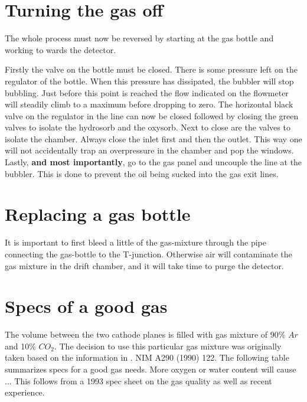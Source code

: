\documentclass[11pt]{report}
\begin{document}
\section{Turning the gas off}

The whole process must now be reversed by starting at the gas bottle 
and working to wards the detector.

Firstly the valve on the bottle must be closed. There is some pressure 
left on the regulator of the bottle. When this pressure has dissipated,
the bubbler will stop bubbling. Just before this point is reached the 
flow indicated on the flowmeter will steadily climb to a maximum before
dropping to zero. The horizontal black valve on the regulator in the 
line can now be closed followed by closing the green valves to isolate
the hydrosorb and the oxysorb. Next to close are the valves to isolate 
the chamber. Always close the inlet first and then the outlet. This way 
one will not accidentally trap an overpressure in the chamber and pop
the windows. Lastly, {\bf and most importantly},
go to the gas panel and uncouple the line at the 
bubbler. This is done to prevent the oil being  sucked into the gas exit  
lines.

\section{Replacing a gas bottle}

It is important to first bleed a little of the gas-mixture through
the pipe connecting the gas-bottle to the T-junction.
Otherwise air will contaminate the gas mixture in the drift chamber, and 
it will take time to purge the detector.


\section{Specs of a good gas}

The volume between the two cathode planes is
filled with gas mixture of 90\% $Ar$ and 10\% $CO_{2}$.
The decision to use this particular gas mixture was originally taken based on the 
information in \cite{But90}. NIM A290 (1990) 122.
The following table summarizes specs for a good gas needs. More oxygen or
water content will cause ...
This follows from a 1993 spec sheet on the gas quality as well as recent
experience.

\end{document}
